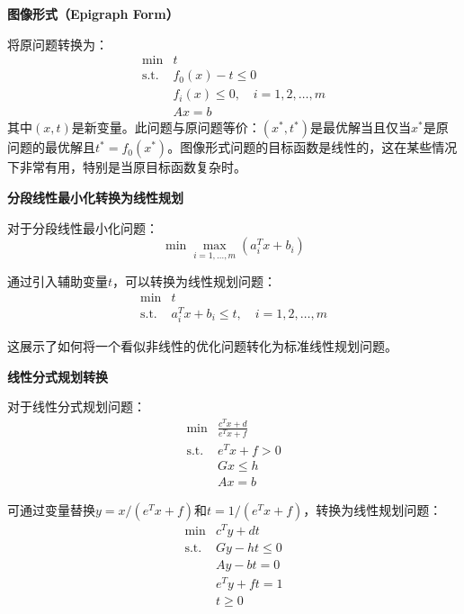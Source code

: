 \documentclass[12pt,a4paper]{book}
\begin{document}
\textbf{图像形式（Epigraph Form）}

将原问题转换为：
\begin{equation}
    \begin{aligned}
        \min & t \\
        \text{s.t.} & f_0(x) - t \leq 0 \\
        & f_i(x) \leq 0, \quad i = 1,2,\dots,m\\
        & Ax = b
    \end{aligned}
\end{equation}
其中$(x,t)$是新变量。此问题与原问题等价：$(x^*,t^*)$是最优解当且仅当$x^*$是原问题的最优解且$t^* = f_0(x^*)$。图像形式问题的目标函数是线性的，这在某些情况下非常有用，特别是当原目标函数复杂时。

\textbf{分段线性最小化转换为线性规划}

对于分段线性最小化问题：
\begin{equation}
    \min \max_{i=1,\dots,m}(a_i^T x + b_i)
\end{equation}

通过引入辅助变量$t$，可以转换为线性规划问题：
\begin{equation}
    \begin{aligned}
        \min & t \\
        \text{s.t.} & a_i^T x + b_i \leq t, \quad i = 1,2,\dots,m
    \end{aligned}
\end{equation}

这展示了如何将一个看似非线性的优化问题转化为标准线性规划问题。

\textbf{线性分式规划转换}

对于线性分式规划问题：
\begin{equation}
    \begin{aligned}
        \min & \frac{c^T x + d}{e^T x + f} \\
        \text{s.t.} & e^T x + f > 0 \\
        & Gx \leq h \\
        & Ax = b
    \end{aligned}
\end{equation}

可通过变量替换$y = x/(e^T x + f)$和$t = 1/(e^T x + f)$，转换为线性规划问题：
\begin{equation}
    \begin{aligned}
        \min & c^T y + dt \\
        \text{s.t.} & Gy - ht \leq 0 \\
        & Ay - bt = 0 \\
        & e^T y + ft = 1 \\
        & t \geq 0
    \end{aligned}
\end{equation}
\end{document}
